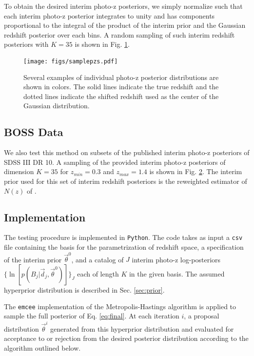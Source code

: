 \documentclass[preprint]{aastex}
\begin{document}
To obtain the desired interim photo-z posteriors, we simply normalize such that 
each interim photo-z posterior integrates to unity and has components 
proportional to the integral of the product of the interim prior and the 
Gaussian redshift posterior over each bins.  A random sampling of such interim 
redshift posteriors with $K=35$ is shown in Fig. \ref{fig:nullpzs}.

\begin{figure}
\texttt{[image: figs/samplepzs.pdf]}
\caption{Several examples of individual photo-z posterior distributions are 
shown in colors.  The solid lines indicate the true redshift and the dotted 
lines indicate the shifted redshift used as the center of the Gaussian 
distribution.}
\label{fig:nullpzs}
\end{figure}

\subsection{BOSS Data}
\label{sec:data}

We also test this method on subsets of the published interim photo-z posteriors 
of SDSS III DR 10.  A sampling of the provided interim photo-z posteriors of 
dimension $K=35$ for $z_{min}=0.3$ and $z_{max}=1.4$ is shown in Fig. 
\ref{fig:datapzs}.  The interim prior used for this set of interim redshift 
posteriors is the reweighted estimator of $N(z)$ of \citet{Sheldon2012}.

\begin{figure}
\caption{}
\label{fig:datapzs}
\end{figure}

\clearpage
\subsection{Implementation}
\label{sec:mcmc}

The testing procedure is implemented in \texttt{Python}.  The code takes as 
input a \texttt{csv} file containing the basis for the parametrization of 
redshift space, a specification of the interim prior $\vec{\theta}^{0}$, and a 
catalog of $J$ interim photo-z log-posteriors 
$\{\ln[p(B_{j}|\vec{d}_{j},\vec{\theta}^{0})]\}_{J}$ each of length $K$ in the 
given basis.  The assumed hyperprior distribution is described in Sec. 
\ref{sec:prior}.

The \texttt{emcee} implementation of the Metropolis-Hastings algorithm is 
applied to sample the full posterior of Eq. \ref{eq:final}.   
\citep{Foreman-Mackey2013}   At each iteration $i$, a proposal distribution 
$\vec{\theta}^{i}$ generated from this hyperprior distribution and evaluated 
for acceptance to or rejection from the desired posterior distribution 
according to the algorithm outlined below.  
\end{document}
